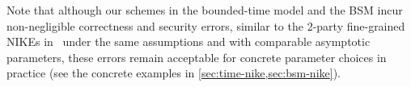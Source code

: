 Note that although our schemes in the bounded-time model and the BSM incur non-negligible correctness and security errors, similar to the 2-party fine-grained NIKEs in~\cite{C:LaVLinWil19,C:CacMau97} under the same assumptions and with comparable asymptotic parameters, these errors remain acceptable for concrete parameter choices in practice (see the concrete examples in \cref{sec:time-nike,sec:bsm-nike}).


